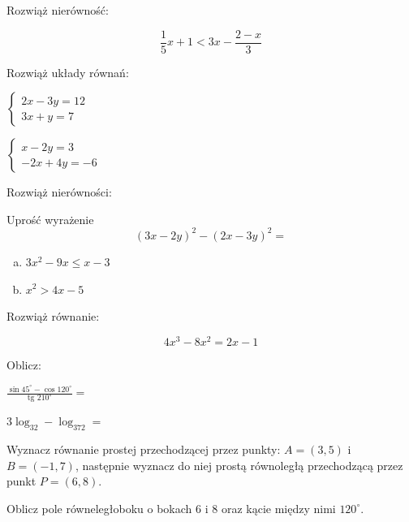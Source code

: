 \documentclass[12pt,a4paper]{article}
\theoremstyle{break}
\begin{document}
	\begin{zad}
		Rozwiąż nierówność:
	\end{zad}
	$$\frac{1}{5}x+1<3x-\frac{2-x}{3}$$

	\begin{zad}
		Rozwiąż układy równań:
	\end{zad}

	$\left\{\begin{array}{l}
		2x-3y=12\\
		3x+y=7
	\end{array}\right.$ \newline \newline

	$\left\{\begin{array}{l}
		x-2y=3\\
		-2x+4y=-6
	\end{array}\right.$

	\begin{zad}
		Rozwiąż nierówności:
	\end{zad}

	\begin{zad}
		Uprość wyrażenie
		$$(3x-2y)^2-(2x-3y)^2=$$
	\end{zad}

	\begin{enumerate}[a)]
		\item$3x^2-9x\leq x-3$
		\item$x^2>4x-5$
	\end{enumerate}

	\begin{zad}
		Rozwiąż równanie:
	\end{zad}
	$$4x^3-8x^2=2x-1$$
	
	\begin{zad}
		Oblicz:
	\end{zad}

	\large$\frac{\sin 45^\circ - \cos120^\circ}{\text{tg }210^\circ}=$
	
	\normalsize $3\log_32-\log_372=$
	\begin{zad}
		Wyznacz równanie prostej przechodzącej przez punkty: $A=(3,5)$ i $B=(-1,7)$, następnie wyznacz do niej prostą równoległą przechodzącą przez punkt $P=(6,8)$.
	\end{zad}
	\begin{zad}
		Oblicz pole równeległoboku o bokach 6 i 8 oraz kącie między nimi $120^\circ$.
	\end{zad}
\end{document}
